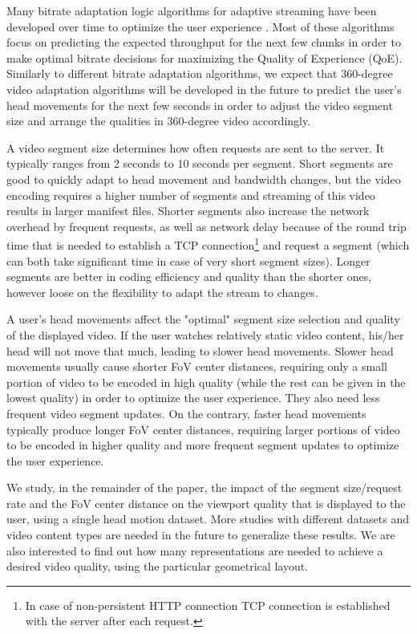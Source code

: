 Many bitrate adaptation logic algorithms for adaptive streaming have been developed over time to optimize the user experience \cite{}. Most of these algorithms focus on predicting the expected throughput for the next few chunks in order to make optimal bitrate decisions for maximizing the Quality of Experience (QoE). Similarly to different bitrate adaptation algorithms, we expect that 360-degree video adaptation algorithms will be developed in the future to predict the user's head movements for the next few seconds in order to adjust the video segment size and arrange the qualities in 360-degree video accordingly. %

A video segment size determines how often requests are sent to the server. It typically ranges from 2 seconds to 10 seconds per segment. Short segments are good to quickly adapt to head movement and bandwidth changes, but the video encoding requires a higher number of segments and streaming of this video results in larger manifest files. Shorter segments also increase the network overhead by frequent requests, as well as network delay because of the round trip time that is needed to establish a TCP connection\footnote{In case of non-persistent HTTP connection TCP connection is established with the server after each request.} and request a segment (which can both take significant time in case of very short segment sizes). Longer segments are better in coding efficiency and quality than the shorter ones, however loose on the flexibility to adapt the stream to changes.

A user's head movements affect the "optimal" segment size selection and quality of the displayed video. If the user watches relatively static video content, his/her head will not move that much, leading to slower head movements. Slower head movements usually cause shorter FoV center distances, requiring only a small portion of video to be encoded in high quality (while the rest can be given in the lowest quality) in order to optimize the user experience. They also need less frequent video segment updates. On the contrary, faster head movements typically produce longer FoV center distances,  requiring larger portions of video to be encoded in higher quality and more frequent segment updates to optimize the user experience.

We study, in the remainder of the paper, the impact of the segment size/request rate and the FoV center distance on the viewport quality that is displayed to the user, using a single head motion dataset. More studies with different datasets and video content types are needed in the future to generalize these results. We are also interested to find out how many representations are needed to achieve a desired video quality, using the particular geometrical layout.
